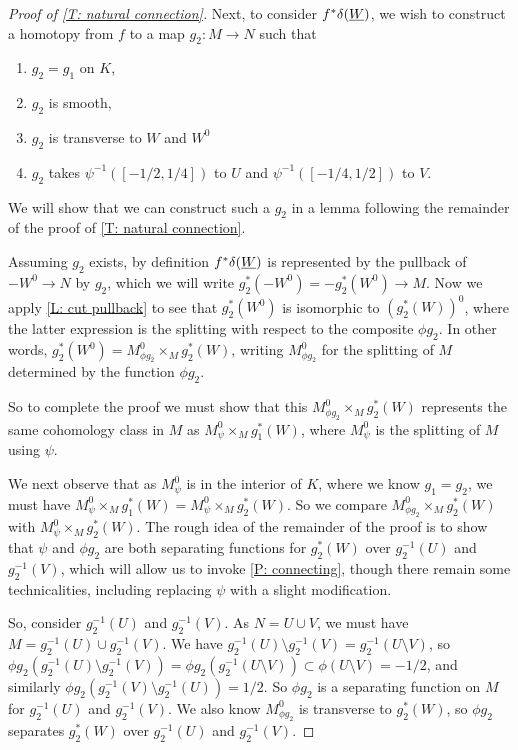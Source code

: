 \begin{proof}[Proof of \cref{T: natural connection}]
	Next, to consider $f^* \delta (\underline{W})$, we wish to construct a homotopy from $f$ to a map $g_2 \colon M \to N$ such that
	\begin{enumerate}
		\item $g_2 = g_1$ on $K$,
		\item $g_2$ is smooth,
		\item $g_2$ is transverse to $W$ and $W^0$
		\item $g_2$ takes $\psi^{-1}([-1/2,1/4])$ to $U$ and $\psi^{-1}([-1/4,1/2])$ to $V$.
	\end{enumerate}
	We will show that we can construct such a $g_2$ in a lemma following the remainder of the proof of \cref{T: natural connection}.

	Assuming $g_2$ exists, by definition $f^* \delta (\underline{W})$ is represented by the pullback of $-W^0 \to N$ by $g_2$, which we will write $g_2^*(-W^0) = - g_2^*(W^0) \to M$.
	Now we apply \cref{L: cut pullback} to see that $g_2^*(W^0)$ is isomorphic to $(g_2^*(W))^0$, where the latter expression is the splitting with respect to the composite $\phi g_2$.
	In other words, $g_2^*(W^0) = M^0_{\phi g_2} \times_M g_2^*(W)$, writing $M^0_{\phi g_2}$ for the splitting of $M$ determined by the function $\phi g_2$.

	So to complete the proof we must show that this $M^0_{\phi g_2} \times_M g_2^*(W)$ represents the same cohomology class in $M$ as $M^0_\psi \times_M g_1^*(W)$, where $M^0_\psi$ is the splitting of $M$ using $\psi$.

	We next observe that as $M^0_\psi$ is in the interior of $K$, where we know $g_1 = g_2$, we must have $M^0_\psi \times_M g_1^*(W) = M^0_\psi \times_M g_2^*(W)$.
	So we compare $M^0_{\phi g_2} \times_M g_2^*(W)$ with $M^0_\psi \times_M g_2^*(W)$.
	The rough idea of the remainder of the proof is to show that $\psi$ and $\phi g_2$ are both separating functions for $g_2^*(W)$ over $g_2^{-1}(U)$ and $g_2^{-1}(V)$, which will allow us to invoke \cref{P: connecting}, though there remain some technicalities, including replacing $\psi$ with a slight modification.

	So, consider $g_2^{-1}(U)$ and $g_2^{-1}(V)$. As $N = U \cup V$, we must have $M = g_2^{-1}(U) \cup g_2^{-1}(V)$.
	We have $g_2^{-1}(U)\setminus g_2^{-1}(V) = g_2^{-1}(U \setminus V)$, so $\phi g_2(g_2^{-1}(U)\setminus g_2^{-1}(V)) = \phi g_2(g_2^{-1}(U \setminus V)) \subset \phi(U \setminus V) = -1/2$, and similarly $\phi g_2(g_2^{-1}(V) \setminus g_2^{-1}(U)) = 1/2$.
	So $\phi g_2$ is a separating function on $M$ for $g_2^{-1}(U)$ and $g_2^{-1}(V)$.
	We also know $M^0_{\phi g_2}$ is transverse to $g_2^*(W)$, so $\phi g_2$ separates $g_2^*(W)$ over $g_2^{-1}(U)$ and $g_2^{-1}(V)$.


\end{proof}
